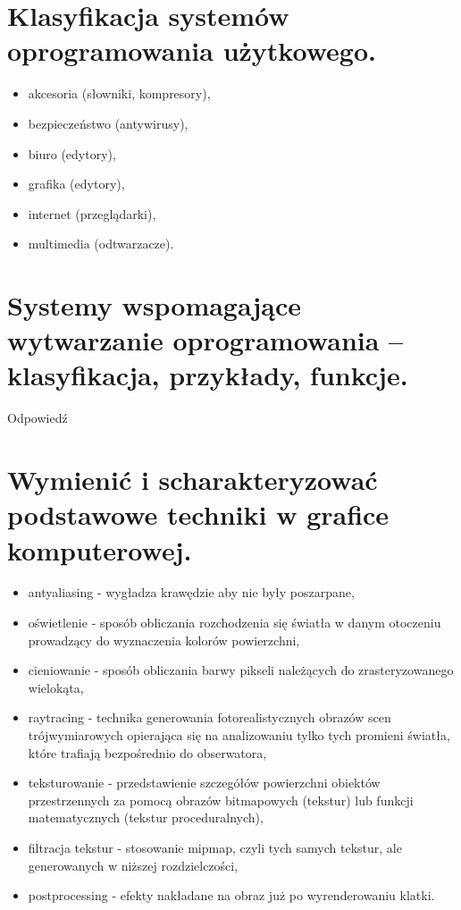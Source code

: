 \documentclass[12pt,a4paper]{article}
\begin{document}
	\section{Klasyfikacja systemów oprogramowania użytkowego.}
	\begin{itemize}
		\item akcesoria (słowniki, kompresory),
		\item bezpieczeństwo (antywirusy),
		\item biuro (edytory),
		\item grafika (edytory),
		\item internet (przeglądarki),
		\item multimedia (odtwarzacze).
	\end{itemize}

	\section{Systemy wspomagające wytwarzanie oprogramowania – klasyfikacja, przykłady, funkcje.}
	Odpowiedź

	\section{Wymienić i scharakteryzować podstawowe techniki w grafice komputerowej.}
	\begin{itemize}
		\item antyaliasing - wygładza krawędzie aby nie były poszarpane,
		\item oświetlenie - sposób obliczania rozchodzenia się światła w danym otoczeniu prowadzący do wyznaczenia kolorów powierzchni, 
		\item cieniowanie - sposób obliczania barwy pikseli należących do zrasteryzowanego wielokąta,
		\item raytracing - technika generowania fotorealistycznych obrazów scen trójwymiarowych opierająca się na analizowaniu tylko tych promieni światła, które trafiają bezpośrednio do obserwatora, 
		\item teksturowanie - przedstawienie szczegółów powierzchni obiektów przestrzennych za pomocą obrazów bitmapowych (tekstur) lub funkcji matematycznych (tekstur proceduralnych),
		\item filtracja tekstur - stosowanie mipmap, czyli tych samych tekstur, ale generowanych w niższej rozdzielczości,
		\item postprocessing - efekty nakładane na obraz już po wyrenderowaniu klatki.
	\end{itemize}
\end{document}
